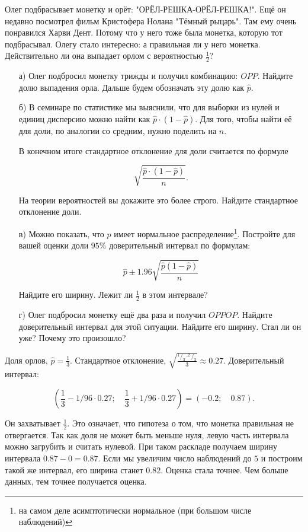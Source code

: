 \documentclass[12pt, a4paper, oneside]{article}
\theoremstyle{plain} %
\theoremstyle{definition}
\newcounter{problem}%
\renewcommand{\theproblem}{\arabic{problem}}
\newenvironment{problem}[1]{
\addtocounter{problem}{1}\noindent{ \color{titleblue} \large \bfseries Упражнение~\theproblem~#1 \vspace{1ex} \newline}
}{ }
\begin{document}
\begin{problem}{(монета Олега)}
Олег подбрасывает монетку и орёт: "ОРЁЛ-РЕШКА-ОРЁЛ-РЕШКА!". Ещё он недавно посмотрел фильм Кристофера Нолана "Тёмный рыцарь". Там ему очень понравился Харви Дент. Потому что у него тоже была монетка, которую тот подбрасывал. Олегу стало интересно: а правильная ли у него монетка. Действительно ли она выпадает орлом с вероятностью $\frac{1}{2}$? 

\begin{enumerate}
	\item[а)]  Олег подбросил монетку трижды и получил комбинацию: $OPP$. Найдите долю выпадения орла.  Дальше будем обозначать эту долю как $\hat p$. 
	
	\item[б)] В семинаре по статистике мы выяснили, что для выборки из нулей и единиц дисперсию можно найти как $\hat p \cdot (1 - \hat p)$. Для того, чтобы найти её для доли, по аналогии со средним, нужно поделить на $n$. 
	
	В конечном итоге стандартное отклонение для доли считается по формуле 
	
	$$ 
	\sqrt{\frac{\hat p \cdot (1 - \hat p)}{n}}.
	$$ 
	
	На теории вероятностей вы докажите это более строго. Найдите стандартное отклонение доли. 
	
	\item[в)] Можно показать, что $\hat p$ имеет нормальное распределение\footnote{на самом деле асимптотически нормальное (при большом числе наблюдений)}. Постройте для вашей оценки доли $95\%$ доверительный интервал по формулам: 
	
	$$
	\hat{p}\pm 1.96 \sqrt{\frac{\hat{p}\left(1-\hat{p}\right)}{n}}
	$$
	
	Найдите его ширину.  Лежит ли $\frac{1}{2}$ в этом интервале? 
	
	\item[г)] Олег подбросил монетку ещё два раза и получил $OPPOP$. Найдите доверительный интервал для этой ситуации. Найдите его ширину. Стал ли он уже? Почему это произошло? 
\end{enumerate}
\end{problem} 

\begin{solution}
Доля орлов,  $\hat p = \frac{1}{3}$. Стандартное отклонение, $\sqrt{\frac{^1/_3 \cdot ^2/_3}{3}} \approx 0.27$. Доверительный интервал: 

\[
\left( \frac{1}{3} - 1/96 \cdot 0.27;  \quad \frac{1}{3} + 1/96 \cdot 0.27 \right) = (-0.2; \quad 0.87).
\]

Он захватывает $\frac{1}{2}$. Это означает, что гипотеза о том, что монетка правильная не отвергается. Так как доля не может быть меньше нуля, левую часть интервала можно загрубить и считать нулевой. При таком раскладе получаем ширину интервала $0.87 - 0 = 0.87$. Если мы увеличим число наблюдений до $5$ и построим такой же интервал, его ширина станет $0.82$. Оценка стала точнее. Чем больше данных, тем точнее получается оценка.
\end{solution} 
\end{document}
